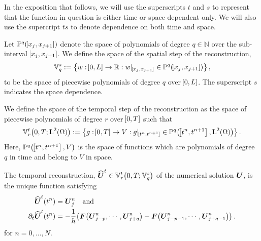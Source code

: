 \documentclass[final]{amsart}
\renewcommand{\vect}[1]{\geovec{#1}}
\renewcommand{\vec}[1]{\geovec{#1}}
\numberwithin{equation}{section}
\begin{document}
In the exposition that follows, we will use the superscripts $t$ and
$s$ to represent that the function in question is either time or space
dependent only.  We will also use the supercript $ts$ to denote
dependence on both time and space.

\begin{Defn}
  Let $\mathbb{P}^{q}\!\left({\!\left[{x_j, x_{j+1}}\right]}\right)$ denote the space of
  polynomials of degree $q\in\mathbb{N}$ over the sub-interval
  $\!\left[{x_j, x_{j+1}}\right]$.  We define the space of the spatial step of the
  reconstruction,
  \begin{equation}
    \mathbb{V}_q^s:=\left\lbrace w:\!\left[{0,L}\right]\rightarrow\mathbb{R}: w|_{\!\left[{x_j,x_{j+1}}\right]}\in \mathbb{P}^{q}\!\left({\!\left[{x_j, x_{j+1}}\right]}\right)\right\rbrace,
  \end{equation}
  to be the space of piecewise polynomials of degree $q$ over $\!\left[{0,L}\right]$.  The superscript $s$ indicates the space dependence.
\end{Defn}

\begin{Defn}
We define the space of the temporal step of
  the reconstruction as the space of piecewise polynomials of degree
  $r$ over $\!\left[{0,T}\right]$ such that
  \begin{equation}
    \mathbb{V}_r^t\!\left({{0,T};\operatorname L^{2}\!\left({\Omega}\right)}\right):=\left\lbrace g:\!\left[{0,T}\right]\rightarrow V: g|_{\!\left[{t^n, t^{n+1}}\right]}\in \mathbb{P}^{q}\!\left({\!\left[{t^n, t^{n+1}}\right],\operatorname L^{2}\!\left({\Omega}\right)}\right)\right\rbrace.
  \end{equation}
  Here, $\mathbb{P}^{q}\!\left({\!\left[{t^n, t^{n+1}}\right],V}\right)$ is the space of functions which are polynomials of degree $q$ in time and belong to $V$ in space.
\end{Defn}

\begin{Defn}\label{defn_temp_rec}
	The temporal reconstruction, $\widehat{\vec{U}}^t\in \mathbb{V}_r^t\qp{0,T;\mathbb{V}_q^s}$ of the numerical solution $\vect{U}$, is the unique function satisfying
	\begin{equation}\label{eq_conds_temp_rec}
	\begin{aligned}
	\widehat{\vec {U}}^t\qp{t^n}&={\vec{U}}^n_j\quad \text{and}\\
	\partial_t\widehat{\vec{U}}^t\qp{t^n}&=- \frac{1}{h}\qp{{\vec{F}\qp{\vec{U}^n_{j-p},\cdots,\vec{U}^n_{j+q}}}-{\vec{F}\qp{\vec{U}^n_{j-p-1},\cdots,\vec{U}^n_{j+q-1}}}}.
	\end{aligned}
	\end{equation}
	for $n=0,\dots,N$.  
\end{Defn}
\end{document}
